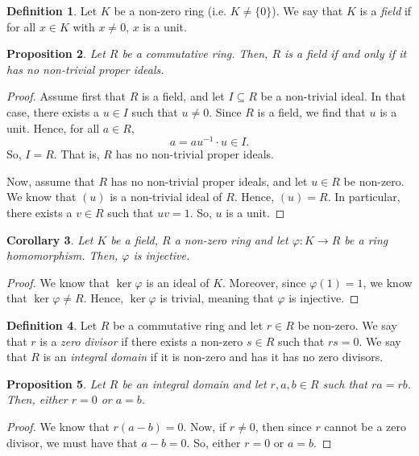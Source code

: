 \documentclass[a4paper, openany]{memoir}
\theoremstyle{definition}
\newtheorem{definition}{Definition}[section]
\theoremstyle{plain}
\newtheorem{proposition}[definition]{Proposition}
\newtheorem{corollary}[definition]{Corollary}
\begin{document}
    \begin{definition}
        Let $K$ be a non-zero ring (i.e. $K \neq \{0\}$). We say that $K$ is a \emph{field} if for all $x \in K$ with $x \neq 0$, $x$ is a unit.
    \end{definition}

    \begin{proposition}
        Let $R$ be a commutative ring. Then, $R$ is a field if and only if it has no non-trivial proper ideals.
    \end{proposition}
    \begin{proof}
        Assume first that $R$ is a field, and let $I \subseteq R$ be a non-trivial ideal. In that case, there exists a $u \in I$ such that $u \neq 0$. Since $R$ is a field, we find that $u$ is a unit. Hence, for all $a \in R$,
        \[a = au^{-1} \cdot u \in I.\]
        So, $I = R$. That is, $R$ has no non-trivial proper ideals.

        Now, assume that $R$ has no non-trivial proper ideals, and let $u \in R$ be non-zero. We know that $(u)$ is a non-trivial ideal of $R$. Hence, $(u) = R$. In particular, there exists a $v \in R$ such that $uv = 1$. So, $u$ is a unit.
    \end{proof}

    \begin{corollary}
        Let $K$ be a field, $R$ a non-zero ring and let $\varphi \colon K \to R$ be a ring homomorphism. Then, $\varphi$ is injective.
    \end{corollary}
    \begin{proof}
        We know that $\ker \varphi$ is an ideal of $K$. Moreover, since $\varphi(1) = 1$, we know that $\ker \varphi \neq R$. Hence, $\ker \varphi$ is trivial, meaning that $\varphi$ is injective.
    \end{proof}

    \begin{definition}
        Let $R$ be a commutative ring and let $r \in R$ be non-zero. We say that $r$ is a \emph{zero divisor} if there exists a non-zero $s \in R$ such that $rs = 0$. We say that $R$ is an \emph{integral domain} if it is non-zero and has it has no zero divisors.
    \end{definition}

    \begin{proposition}
        Let $R$ be an integral domain and let $r, a, b \in R$ such that $ra = rb$. Then, either $r = 0$ or $a = b$.
    \end{proposition}
    \begin{proof}
        We know that $r(a - b) = 0$. Now, if $r \neq 0$, then since $r$ cannot be a zero divisor, we must have that $a - b = 0$. So, either $r = 0$ or $a = b$.
    \end{proof}
\end{document}

